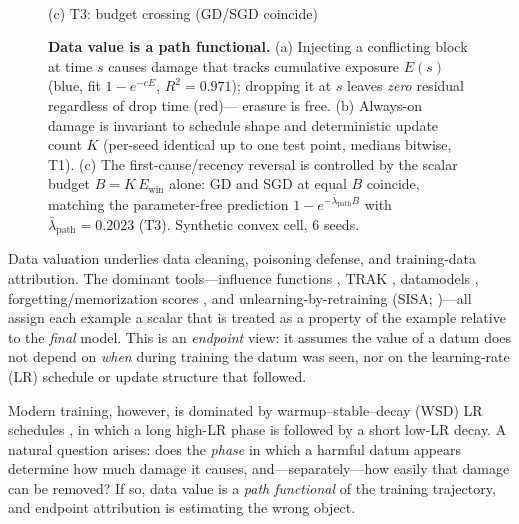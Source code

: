\documentclass{article}
\newcommand{\Expo}{E}         %
\newcommand{\Ewin}{E_{\mathrm{win}}}
\newcommand{\B}{B}            %
\newcommand{\lam}{\lambda}
\newcommand{\lampath}{\bar{\lam}_{\mathrm{path}}}
\begin{document}
\begin{figure}[t]
\begin{minipage}{0.31\textwidth}
\\[2pt]
{\small (c) T3: budget crossing (GD/SGD coincide)}
\end{minipage}
\caption{\textbf{Data value is a path functional.} (a) Injecting a conflicting block at time
$s$ causes damage that tracks cumulative exposure $\Expo(s)$ (blue, fit $1-e^{-c\Expo}$,
$R^2{=}0.971$); dropping it at $s$ leaves \emph{zero} residual regardless of drop time (red)---
erasure is free. (b) Always-on damage is invariant to schedule shape and deterministic update
count $K$ (per-seed identical up to one test point, medians bitwise, T1). (c) The first-cause/recency reversal is controlled by the
scalar budget $\B=K\,\Ewin$ alone: GD and SGD at equal $\B$ coincide, matching the parameter-free
prediction $1-e^{-\lampath\B}$ with $\lampath=0.2023$ (T3). Synthetic convex cell, 6 seeds.}
\label{fig:main}
\end{figure}

Data valuation underlies data cleaning, poisoning defense, and training-data attribution.
The dominant tools---influence functions \citep{koh2017understanding}, TRAK
\citep{park2023trak}, datamodels \citep{ilyas2022datamodels}, forgetting/memorization scores
\citep{toneva2019forgetting}, and unlearning-by-retraining (SISA; \citealp{bourtoule2021sisa})---all assign each example a scalar that is treated as a property of the
example relative to the \emph{final} model. This is an \emph{endpoint} view: it assumes the
value of a datum does not depend on \emph{when} during training the datum was seen, nor on the
learning-rate (LR) schedule or update structure that followed.

Modern training, however, is dominated by warmup--stable--decay (WSD) LR schedules
\citep{hu2024minicpm}, in which a long high-LR phase is followed by a short low-LR decay. A
natural question arises: does the \emph{phase} in which a harmful datum appears determine how
much damage it causes, and---separately---how easily that damage can be removed? If so, data
value is a \emph{path functional} of the training trajectory, and endpoint attribution is
estimating the wrong object.
\end{document}
